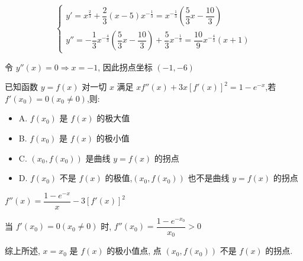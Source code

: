 \begin{solution}

	$$\begin{cases}
		y' = x^{\frac{2}{3}}+\dfrac{2}{3}(x-5)x^{-\frac{1}{3}} = x^{-\frac{1}{3}}(\dfrac{5}{3}x-\dfrac{10}{3})\\
		y''= -\dfrac{1}{3}x^{-\frac{4}{3}}(\dfrac{5}{3}x-\dfrac{10}{3})+\dfrac{5}{3}x^{-\frac{1}{3}} = \dfrac{10}{9}x^{-\frac{4}{3}}(x+1) 
	\end{cases}$$

	令 $y''(x) = 0\Rightarrow x =-1$, 因此拐点坐标 $(-1,-6)$
\end{solution}

\begin{example}[][Exam: 27.4.20]
	已知函数 $y=f(x)$ 对一切 $x$ 满足 $xf''(x)+3x[f'(x)]^{2}=1-e^{-x}$,若 $f'(x_{0})=0(x_{0}\neq 0)$,则:
\begin{itemize}
	\item A. $f(x_{0})$ 是 $f(x)$ 的极大值
	\item B. $f(x_{0})$ 是 $f(x)$ 的极小值
	\item C. $(x_{0},f(x_{0}))$ 是曲线 $y=f(x)$ 的拐点
	\item D. $f(x_{0})$ 不是 $f(x)$ 的极值,$(x_{0},f(x_{0}))$ 也不是曲线 $y=f(x)$ 的拐点
\end{itemize}
\end{example}

\begin{solution}

	$f''(x) = \dfrac{1-e^{-x}}{x} -3[f'(x)]^{2}$

	当 $f'(x_{0}) = 0(x_{0}\neq 0)$ 时, $f''(x_{0}) = \dfrac{1-e^{-x_{0}}}{x_{0}} > 0$

	综上所述, $x = x_{0}$ 是 $f(x)$ 的极小值点, 点 $(x_{0},f(x_{0}))$ 不是 $f(x)$ 的拐点.
\end{solution}
